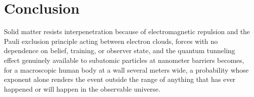 \documentclass[11pt]{article}
\begin{document}
\section{Conclusion}

Solid matter resists interpenetration because of electromagnetic repulsion and the Pauli exclusion principle acting between electron clouds, forces with no dependence on belief, training, or observer state, and the quantum tunneling effect genuinely available to subatomic particles at nanometer barriers becomes, for a macroscopic human body at a wall several meters wide, a probability whose exponent alone renders the event outside the range of anything that has ever happened or will happen in the observable universe.
\end{document}
